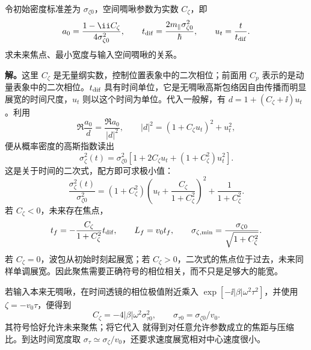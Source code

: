 \begin{exbox}[带二次相位的波包何时最窄]
令初始密度标准差为 $\sigma_{\zeta0}$，空间啁啾参数为实数 $C_\zeta$，即
\begin{equation*}
 a_0=\frac{1-\ii C_\zeta}{4\sigma_{\zeta0}^2},\qquad
 t_{\rm dif}=\frac{2m_\parallel\sigma_{\zeta0}^2}{\hbar},\qquad
 u_t=\frac{t}{t_{\rm dif}}.
\end{equation*}
求未来焦点、最小宽度与输入空间啁啾的关系。

\textbf{解。}这里 $C_\zeta$ 是无量纲实数，控制位置表象中的二次相位；前面用 $C_p$ 表示的是动量表象中的二次相位。$t_{\rm dif}$ 具有时间单位，它是无啁啾高斯包络因自由传播而明显展宽的时间尺度，$u_t$ 则以这个时间为单位。代入一般解，有 $d=1+(C_\zeta+\ii)u_t$。利用
\begin{equation*}
 \Re\frac{a_0}{d}=\frac{\Re a_0}{|d|^2},\qquad
 |d|^2=(1+C_\zeta u_t)^2+u_t^2,
\end{equation*}
便从概率密度的高斯指数读出
\begin{equation*}
 \sigma_\zeta^2(t)=\sigma_{\zeta0}^2
 \left[1+2C_\zeta u_t+(1+C_\zeta^2)u_t^2\right].
\end{equation*}
这是关于时间的二次式，配方即可求极小值：
\begin{equation*}
 \frac{\sigma_\zeta^2(t)}{\sigma_{\zeta0}^2}
 =(1+C_\zeta^2)
 \left(u_t+\frac{C_\zeta}{1+C_\zeta^2}\right)^2
 +\frac1{1+C_\zeta^2}.
\end{equation*}
若 $C_\zeta<0$，未来存在焦点，
\begin{equation}
 t_f=-\frac{C_\zeta}{1+C_\zeta^2}t_{\rm dif},\qquad
 L_f=v_0t_f,\qquad
 \sigma_{\zeta,\min}=\frac{\sigma_{\zeta0}}{\sqrt{1+C_\zeta^2}}.
 \label{eq:electron-gaussian-focus}
\end{equation}
若 $C_\zeta=0$，波包从初始时刻起展宽；若 $C_\zeta>0$，二次式的焦点位于过去，未来同样单调展宽。因此聚焦需要正确符号的相位相关，而不只是足够大的能宽。

若输入本来无啁啾，在时间透镜的相位极值附近乘入 $\exp[-\ii|\beta|\omega^2\tau^2]$，并使用 $\zeta=-v_0\tau$，便得到
\begin{equation*}
 C_\zeta=-4|\beta|\omega^2\sigma_{\tau0}^2,
 \qquad \sigma_{\tau0}=\sigma_{\zeta0}/v_0.
\end{equation*}
其符号恰好允许未来聚焦；将它代入 就得到对任意允许参数成立的焦距与压缩比。到达时间宽度取 $\sigma_\tau\simeq\sigma_\zeta/v_0$，还要求速度展宽相对中心速度很小。
\end{exbox}

